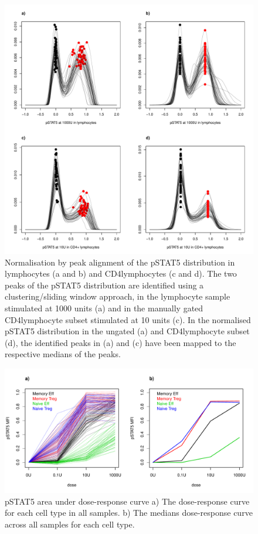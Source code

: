 \begin{figure}[h]
    \centering
    \includegraphics[scale=.5]{IL2/figures/pstat5-peak-normalisation.pdf}
    {Normalisation by peak alignment of the pSTAT5 distribution in lymphocytes (a and b) and CD4\positive lymphocytes (c and d).}
    {
      The two peaks of the pSTAT5 distribution are identified using a clustering/sliding window approach,
      in the lymphocyte sample stimulated at 1000 units (a) and in the manually gated CD4\positive lymphocyte subset stimulated at 10 units (c).
      In the normalised pSTAT5 distribution in the ungated (a) and CD4\positive lymphocyte subset (d),
      the identified peaks in (a) and (c) have been mapped to the respective medians of the peaks.
    }
\end{figure} 
\begin{figure}[h]
    \centering
    \includegraphics[scale=.5]{IL2/figures/pstat5-auc-celltypes.pdf}
    { pSTAT5 area under dose-response curve }
    { a) The dose-response curve for each cell type in all samples. b) The medians dose-response curve across all samples for each cell type.}
\end{figure} 
